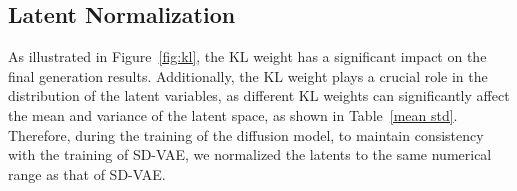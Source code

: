 \subsection*{Latent Normalization}

As illustrated in Figure~\ref{fig:kl}, the KL weight has a significant impact on the final generation results. Additionally, the KL weight plays a crucial role in the distribution of the latent variables, as different KL weights can significantly affect the mean and variance of the latent space, as shown in Table~\ref{mean std}. Therefore, during the training of the diffusion model, to maintain consistency with the training of SD-VAE, we normalized the latents to the same numerical range as that of SD-VAE.

\begin{table}[ht]
\vskip 0.15in
\caption{\textbf{The distribution of latent space changes with kl weight.} Calculate the value by sampling 10,000 samples from the ImageNet $256\times256$, encoded by VAE aligned with DINOv2-base.}
\begin{center}
\begin{small}
\end{small}
\end{center}
\label{mean std}
\vskip -0.1in
\end{table}


